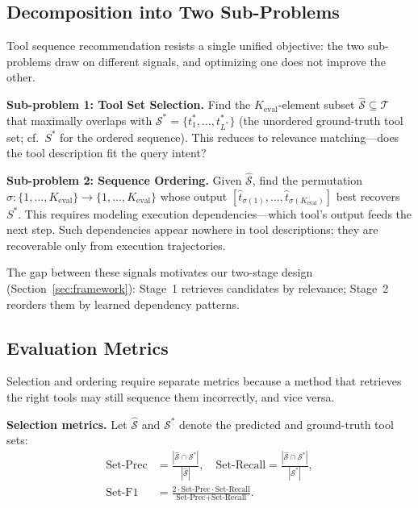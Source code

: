 \documentclass[lettersize,journal]{IEEEtran}
\begin{document}
\subsection{Decomposition into Two Sub-Problems}

Tool sequence recommendation resists a single unified objective: the two sub-problems draw on different signals, and optimizing one does not improve the other.

\textbf{Sub-problem 1: Tool Set Selection.}
Find the $K_{\mathrm{eval}}$-element subset $\hat{\mathcal{S}} \subseteq \mathcal{T}$ that maximally overlaps with $\mathcal{S}^* = \{t_1^*, \ldots, t_{L^*}^*\}$ (the unordered ground-truth tool set; cf.\ $S^*$ for the ordered sequence).
This reduces to relevance matching---does the tool description fit the query intent?

\textbf{Sub-problem 2: Sequence Ordering.}
Given $\hat{\mathcal{S}}$, find the permutation $\sigma: \{1,\ldots,K_{\mathrm{eval}}\} \to \{1,\ldots,K_{\mathrm{eval}}\}$ whose output $[\hat{t}_{\sigma(1)}, \ldots, \hat{t}_{\sigma(K_{\mathrm{eval}})}]$ best recovers $S^*$.
This requires modeling execution dependencies---which tool's output feeds the next step.
Such dependencies appear nowhere in tool descriptions; they are recoverable only from execution trajectories.

The gap between these signals motivates our two-stage design (Section~\ref{sec:framework}): Stage~1 retrieves candidates by relevance; Stage~2 reorders them by learned dependency patterns.

\subsection{Evaluation Metrics}

Selection and ordering require separate metrics because a method that retrieves the right tools may still sequence them incorrectly, and vice versa.

\textbf{Selection metrics.}
Let $\hat{\mathcal{S}}$ and $\mathcal{S}^*$ denote the predicted and ground-truth tool sets:
\begin{align}
\text{Set-Prec} &= \frac{|\hat{\mathcal{S}} \cap \mathcal{S}^*|}{|\hat{\mathcal{S}}|}, \quad
\text{Set-Recall} = \frac{|\hat{\mathcal{S}} \cap \mathcal{S}^*|}{|\mathcal{S}^*|}, \label{eq:sel_pr} \\
\text{Set-F1} &= \frac{2 \cdot \text{Set-Prec} \cdot \text{Set-Recall}}{\text{Set-Prec} + \text{Set-Recall}}. \label{eq:f1}
\end{align}
\end{document}
